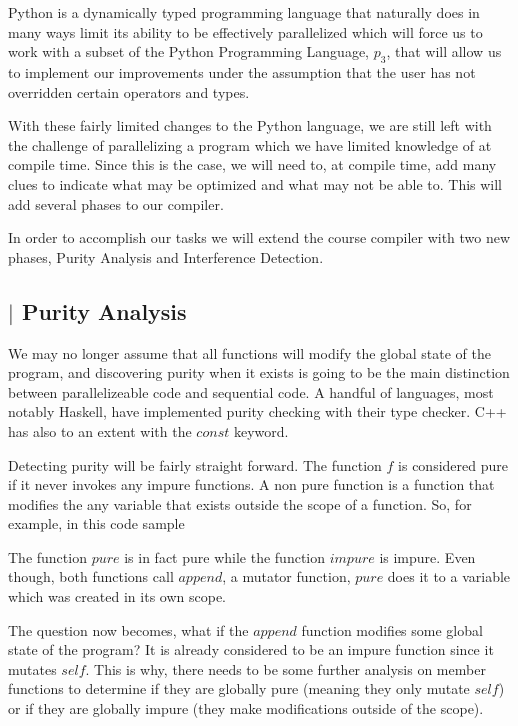 \documentclass{article}
\begin{document}
\begin{multicols}{2}
Python is a dynamically typed programming language that naturally does in many
ways limit its ability to be effectively parallelized which will force us to
work with a subset of the Python Programming Language, $p_3$, that will allow us to
implement our improvements under the assumption that the user has not
overridden certain operators and types.

With these fairly limited changes to the Python language, we are still left
with the challenge of parallelizing a program which we have limited knowledge
of at compile time.  Since this is the case, we will need to, at compile time,
add many clues to indicate what may be optimized and what may not be able to.
This will add several phases to our compiler.

In order to accomplish our tasks we will extend the course compiler with two
new phases, Purity Analysis and Interference Detection. 

\subsection*{$\vert$ Purity Analysis}

We may no longer assume that all functions will modify the global state of the
program, and discovering purity when it exists is going to be the main
distinction between parallelizeable code and sequential code. A handful of
languages, most notably Haskell, have implemented purity checking with their
type checker. C++ has also to an extent with the $const$ keyword.

Detecting purity will be fairly straight forward. The function $f$ is
considered pure if it never invokes any impure functions. A non pure function
is a function that modifies the any variable that exists outside the scope of a
function. So, for example, in this code sample



The function $pure$ is in fact pure while the function $impure$ is impure. Even
though, both functions call $append$, a mutator function, $pure$ does it to a
variable which was created in its own scope.

The question now becomes, what if the $append$ function modifies some global
state of the program? It is already considered to be an impure function since
it mutates $self$. This is why, there needs to be some further analysis on
member functions to determine if they are globally pure (meaning they only
mutate $self$) or if they are globally impure (they make modifications outside
of the scope).


\end{multicols}
\end{document}
